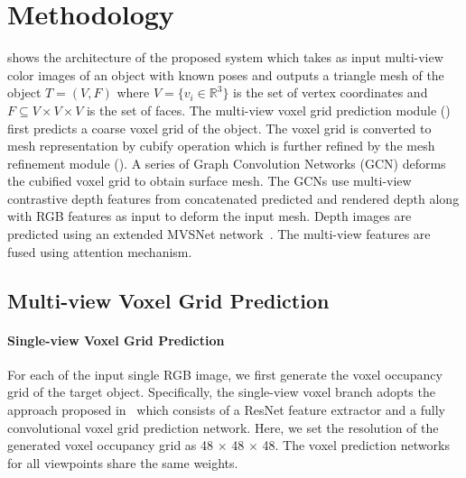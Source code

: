 \section{Methodology}
 shows the architecture of the proposed system which takes as input multi-view color images of an object with known poses and outputs a triangle mesh of the object $ T = (V, F) $ where $ V = \{ v_i \in \mathbb{R}^3\} $ is the set of vertex coordinates and $ F \subseteq V \times V \times V $ is the set of faces.
The multi-view voxel grid prediction module () first predicts a coarse voxel grid of the object.
The voxel grid is converted to mesh representation by cubify operation which is further refined by the mesh refinement module ().
A series of Graph Convolution Networks (GCN) deforms the cubified voxel grid to obtain surface mesh.
The GCNs use multi-view contrastive depth features from concatenated predicted and rendered depth along with RGB features as input to deform the input mesh.
Depth images are predicted using an extended MVSNet network~\cite{yao2018mvsnet}.
The multi-view features are fused using attention mechanism.

\subsection{Multi-view Voxel Grid Prediction}
\label{subsec:multiview_voxel}

\paragraph{Single-view Voxel Grid Prediction}
For each of the input single RGB image, we first generate the voxel occupancy grid of the target object.
Specifically, the single-view voxel branch adopts the approach proposed in~\cite{gkioxari2019meshrcnn} which consists of a ResNet feature extractor and a fully convolutional voxel grid prediction network. 
Here, we set the resolution of the generated voxel occupancy grid as 48 $\times$ 48 $\times$ 48. 
The voxel prediction networks for all viewpoints share the same weights.

